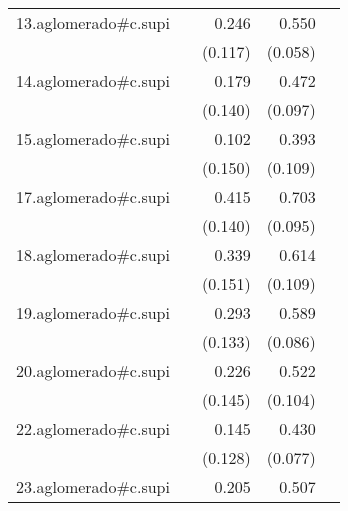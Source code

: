 {\begin{longtable}{l*{4}{D{.}{.}{-1}}}
\addlinespace
13.aglomerado#c.supi&                     &       0.246\sym{*}  &       0.550\sym{***}&                     \\
            &                     &     (0.117)         &     (0.058)         &                     \\
\addlinespace
14.aglomerado#c.supi&                     &       0.179         &       0.472\sym{***}&                     \\
            &                     &     (0.140)         &     (0.097)         &                     \\
\addlinespace
15.aglomerado#c.supi&                     &       0.102         &       0.393\sym{***}&                     \\
            &                     &     (0.150)         &     (0.109)         &                     \\
\addlinespace
17.aglomerado#c.supi&                     &       0.415\sym{**} &       0.703\sym{***}&                     \\
            &                     &     (0.140)         &     (0.095)         &                     \\
\addlinespace
18.aglomerado#c.supi&                     &       0.339\sym{*}  &       0.614\sym{***}&                     \\
            &                     &     (0.151)         &     (0.109)         &                     \\
\addlinespace
19.aglomerado#c.supi&                     &       0.293\sym{*}  &       0.589\sym{***}&                     \\
            &                     &     (0.133)         &     (0.086)         &                     \\
\addlinespace
20.aglomerado#c.supi&                     &       0.226         &       0.522\sym{***}&                     \\
            &                     &     (0.145)         &     (0.104)         &                     \\
\addlinespace
22.aglomerado#c.supi&                     &       0.145         &       0.430\sym{***}&                     \\
            &                     &     (0.128)         &     (0.077)         &                     \\
\addlinespace
23.aglomerado#c.supi&                     &       0.205         &       0.507\sym{***}&                     \\

\end{longtable}}
